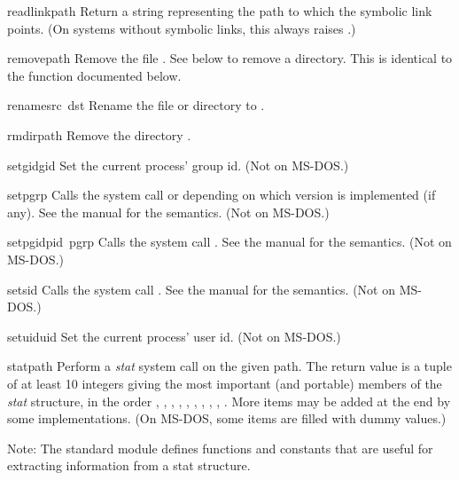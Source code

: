 \begin{funcdesc}{readlink}{path}
Return a string representing the path to which the symbolic link
points.  (On systems without symbolic links, this always raises
.)
\end{funcdesc}

\begin{funcdesc}{remove}{path}
Remove the file .  See  below to remove a directory.
This is identical to the  function documented below.
\end{funcdesc}

\begin{funcdesc}{rename}{src\, dst}
Rename the file or directory  to .
\end{funcdesc}

\begin{funcdesc}{rmdir}{path}
Remove the directory .
\end{funcdesc}

\begin{funcdesc}{setgid}{gid}
Set the current process' group id.
(Not on MS-DOS.)
\end{funcdesc}

\begin{funcdesc}{setpgrp}{}
Calls the system call  or 
depending on which version is implemented (if any).  See the \UNIX{}
manual for the semantics.
(Not on MS-DOS.)
\end{funcdesc}

\begin{funcdesc}{setpgid}{pid\, pgrp}
Calls the system call .  See the \UNIX{} manual for
the semantics.
(Not on MS-DOS.)
\end{funcdesc}

\begin{funcdesc}{setsid}{}
Calls the system call .  See the \UNIX{} manual for the
semantics.
(Not on MS-DOS.)
\end{funcdesc}

\begin{funcdesc}{setuid}{uid}
Set the current process' user id.
(Not on MS-DOS.)
\end{funcdesc}

\begin{funcdesc}{stat}{path}
Perform a {\em stat} system call on the given path.  The return value
is a tuple of at least 10 integers giving the most important (and
portable) members of the {\em stat} structure, in the order
,
,
,
,
,
,
,
,
,
.
More items may be added at the end by some implementations.
(On MS-DOS, some items are filled with dummy values.)

Note: The standard module  defines functions and constants
that are useful for extracting information from a stat structure.
\end{funcdesc}

